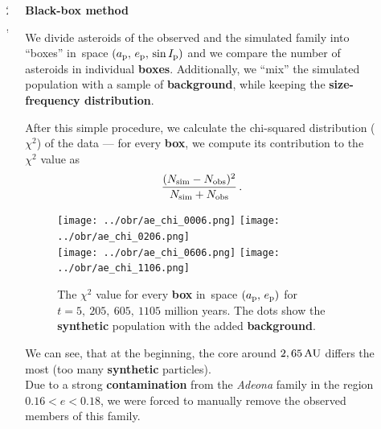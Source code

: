 \documentclass{beamer}
\newlength{\sep}
\newlength{\vyska}
\newlength{\vyskaB}
\newlength{\vyskaC}
\newlength{\side}
\newlength{\main}
\newlength{\newparskip}
\begin{document}
\begin{frame}
\begin{columns}[t]
\begin{column}{\main}
\begin{tcolorbox}[title=Simulation of orbital evolution\vphantom{Úy},height=0.75\vyskaB]
\begin{figure}
		\label{fig:ae_chi2}
	\end{figure}

\vspace{1.5cm}

\end{tcolorbox}
\vspace{\sep}
\end{column}

\begin{column}{2\sep}
\end{column}

\begin{column}{\side}
\begin{tcolorbox}[title=Age of the \textit{Eunomia} family\vphantom{Úy},height=0.75\vyskaC]
{\centering \large \bfseries Black-box method} \cite{broz19} \\[6pt]

{\small We divide asteroids of the observed and the simulated family into \enquote{boxes} in~space $(a_{\rm p},\,e_{\rm p},\,\sin I_{\rm p})$ and we compare the number of asteroids in individual \textbf{boxes}. Additionally, we \enquote{mix} the simulated population with a sample of \textbf{background}, while keeping the \textbf{size-frequency distribution}. 


After this simple procedure, we calculate the chi-squared distribution ($\chi^2$) of the data --- for every \textbf{box}, we compute its contribution to the $\chi^2$ value as
\begin{align*}
	\frac{(N_{\rm sim}-N_{\rm obs})^2}{N_{\rm sim}+N_{\rm obs}}\,.
\end{align*}
}
	\begin{figure}
	\centering
	\texttt{[image: ../obr/ae\_chi\_0006.png]}
	\texttt{[image: ../obr/ae\_chi\_0206.png]}\\
	\texttt{[image: ../obr/ae\_chi\_0606.png]}
	\texttt{[image: ../obr/ae\_chi\_1106.png]}
	\captionsetup{width=.8\linewidth}
	\caption{The $\chi^2$ value for every \textbf{box} in~space $(a_{\rm p},\,e_{\rm p})$ for $t=5,\ 205,\ 605,\ 1105$ million years. The dots show the \textbf{synthetic} population with the added \textbf{background}.} 
	\label{fig:ae_chi2}
	\end{figure}

We can see, that at the beginning, the core around  $2,65\,{\rm AU}$ differs the most (too many \textbf{synthetic} particles).\\[\newparskip]   

Due to a strong \textbf{contamination} from the \textit{Adeona} family in the region $0.16<e<0.18$, we were forced to manually remove the observed members of this family.\\[\newparskip]


\end{tcolorbox}
\end{column}
\end{columns}
\end{frame}
\end{document}
